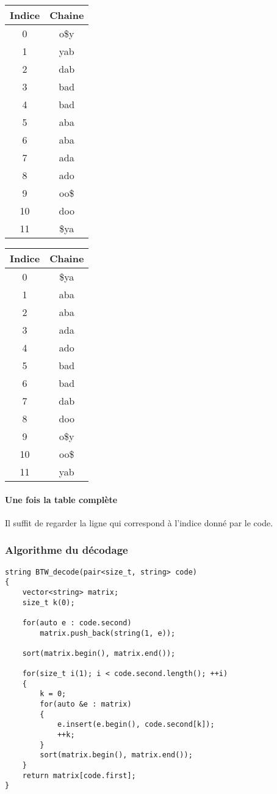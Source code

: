 \begin{tabular}{|c|c|}
    \hline
    Indice & Chaine \\
    \hline
    0 & o\$y\\
    \hline
    1 & yab   \\
    \hline
    2 & dab \\
    \hline
    3 & bad\\
    \hline
    4 & bad\\
    \hline
    5 & aba\\
    \hline
    6 & aba\\
    \hline
    7 & ada\\
    \hline
    8 & ado\\
    \hline
    9 & oo\$\\
    \hline
    10 & doo\\
    \hline
    11 & \$ya\\
    \hline
\end{tabular}

\begin{tabular}{|c|c|}
    \hline
    Indice & Chaine \\
    \hline
    0 & \$ya\\
    \hline
    1 & aba   \\
    \hline
    2 & aba \\
    \hline
    3 & ada\\
    \hline
    4 & ado\\
    \hline
    5 & bad\\
    \hline
    6 & bad\\
    \hline
    7 & dab\\
    \hline
    8 & doo\\
    \hline
    9 & o\$y\\
    \hline
    10 & oo\$\\
    \hline
    11 & yab\\
    \hline
\end{tabular}

\paragraph{Une fois la table complète}

\par Il suffit de regarder la ligne qui correspond à l'indice donné par le code.


\subsubsection{Algorithme du décodage}
\begin{verbatim}
string BTW_decode(pair<size_t, string> code)
{
	vector<string> matrix;
	size_t k(0);
	
	for(auto e : code.second)
		matrix.push_back(string(1, e));
		
	sort(matrix.begin(), matrix.end());
	
	for(size_t i(1); i < code.second.length(); ++i)
	{
		k = 0;
		for(auto &e : matrix)
		{
			e.insert(e.begin(), code.second[k]);
			++k;
		}
		sort(matrix.begin(), matrix.end());
	}
	return matrix[code.first];
}
\end{verbatim}